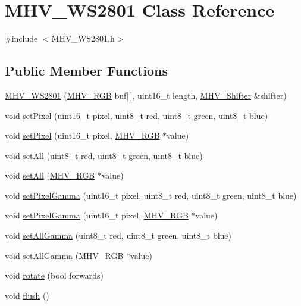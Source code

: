 \hypertarget{class_m_h_v___w_s2801}{
\section{\-M\-H\-V\-\_\-\-W\-S2801 \-Class \-Reference}
\label{class_m_h_v___w_s2801}
}


{\ttfamily \#include $<$\-M\-H\-V\-\_\-\-W\-S2801.\-h$>$}

\subsection*{\-Public \-Member \-Functions}
\begin{DoxyCompactItemize}
\item 
\hyperlink{class_m_h_v___w_s2801_aa211bc6c3537fc071f1aaa30146283c0}{\-M\-H\-V\-\_\-\-W\-S2801} (\hyperlink{_m_h_v___r_g_b_8h_a17bc0cb27c702aac95873e5aab2ead87}{\-M\-H\-V\-\_\-\-R\-G\-B} buf\mbox{[}$\,$\mbox{]}, uint16\-\_\-t length, \hyperlink{class_m_h_v___shifter}{\-M\-H\-V\-\_\-\-Shifter} \&shifter)
\item 
void \hyperlink{class_m_h_v___w_s2801_a04ed0736017e78051b6b978711a702f7}{set\-Pixel} (uint16\-\_\-t pixel, uint8\-\_\-t red, uint8\-\_\-t green, uint8\-\_\-t blue)
\item 
void \hyperlink{class_m_h_v___w_s2801_a705c1c3ea1fe8fe9e4c37d2ced60592b}{set\-Pixel} (uint16\-\_\-t pixel, \hyperlink{_m_h_v___r_g_b_8h_a17bc0cb27c702aac95873e5aab2ead87}{\-M\-H\-V\-\_\-\-R\-G\-B} $\ast$value)
\item 
void \hyperlink{class_m_h_v___w_s2801_a00d491482a75792edc2c51d7ee909a48}{set\-All} (uint8\-\_\-t red, uint8\-\_\-t green, uint8\-\_\-t blue)
\item 
void \hyperlink{class_m_h_v___w_s2801_abaf0a7f398f3c0fb3d079717f93c8966}{set\-All} (\hyperlink{_m_h_v___r_g_b_8h_a17bc0cb27c702aac95873e5aab2ead87}{\-M\-H\-V\-\_\-\-R\-G\-B} $\ast$value)
\item 
void \hyperlink{class_m_h_v___w_s2801_a68788050aebca01edb4e7c8ed09603bb}{set\-Pixel\-Gamma} (uint16\-\_\-t pixel, uint8\-\_\-t red, uint8\-\_\-t green, uint8\-\_\-t blue)
\item 
void \hyperlink{class_m_h_v___w_s2801_a37a33b628bcd6a99e3797ade67956786}{set\-Pixel\-Gamma} (uint16\-\_\-t pixel, \hyperlink{_m_h_v___r_g_b_8h_a17bc0cb27c702aac95873e5aab2ead87}{\-M\-H\-V\-\_\-\-R\-G\-B} $\ast$value)
\item 
void \hyperlink{class_m_h_v___w_s2801_ac18e04e627235d3728ff3a760c73e6d3}{set\-All\-Gamma} (uint8\-\_\-t red, uint8\-\_\-t green, uint8\-\_\-t blue)
\item 
void \hyperlink{class_m_h_v___w_s2801_a4cb616870d842a25f044ca272367eb50}{set\-All\-Gamma} (\hyperlink{_m_h_v___r_g_b_8h_a17bc0cb27c702aac95873e5aab2ead87}{\-M\-H\-V\-\_\-\-R\-G\-B} $\ast$value)
\item 
void \hyperlink{class_m_h_v___w_s2801_a75c36c7e1cfc0ebc60ea9f2a8256d781}{rotate} (bool forwards)
\item 
void \hyperlink{class_m_h_v___w_s2801_a74dd828bce3b4473aac272a5791b03b3}{flush} ()
\end{DoxyCompactItemize}


